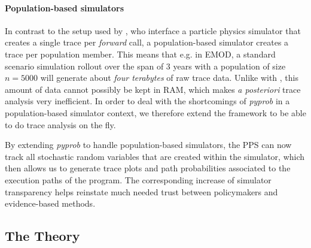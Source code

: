 \documentclass{article}
\begin{document}
\paragraph{Population-based simulators} In contrast to the setup used by \cite{baydin2018efficient}, who interface a particle physics simulator that creates a single trace per \textit{forward} call, a population-based simulator creates a trace per population member. This means that e.g. in EMOD, a standard scenario simulation rollout over the span of $3$ years  
with a population of size $n=5000$ \cite{smith2008towards} will generate about \textit{four terabytes} of raw trace data. Unlike with \citep{baydin2018efficient}, this amount of data cannot possibly be kept in RAM, which makes \textit{a posteriori} trace analysis very inefficient. 
In order to deal with the shortcomings of \textit{pyprob} in a population-based simulator context, we therefore extend the framework to be able to do trace analysis on the fly.

By extending \textit{pyprob} to handle population-based simulators, the PPS can now track all stochastic random variables that are created within the simulator, which then allows us to generate trace plots and path probabilities associated to the execution paths of the program.
The corresponding increase of simulator transparency helps reinstate much needed trust between policymakers and evidence-based methods.

\subsection{The Theory}
\end{document}

